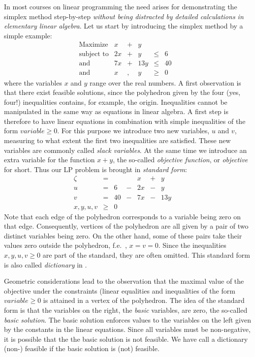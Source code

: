 \documentclass[ukenglish]{nik}
\begin{document}
In most courses on linear programming the need arises for demonstrating the simplex method step-by-step 
\emph{without being distracted by detailed calculations in elementary linear algebra}. Let us start by
introducing the simplex method by a simple example:
\[
    \begin{array}{llcrcrcrcrcrcr}
    \text{Maximize}  &    x &+&    y \\
    \text{subject to}&  2 x &+&    y &\leq&   6\\
    \text{and}&         7 x &+& 13 y &\leq&  40\\
    \text{and}       &    x &,&    y &\geq&0    &
    \end{array}
\]
where the variables $x$ and $y$ range over the real numbers.
A first observation is that there exist feasible solutions,
since the polyhedron given by the four (yes, four!) inequalities contains,
for example, the origin. Inequalities cannot be manipulated in the same
way as equations in linear algebra. A first step is therefore to
have linear equations in combination with simple inequalities of the form
$\mathit{variable}\geq 0$. For this purpose we introduce
two new variables, $u$ and $v$, measuring to what extent the first
two inequalities are satisfied. These new variables are commonly called
\emph{slack variables}. At the same time we introduce an extra variable
for the function $x+y$, the so-called \emph{objective function},
or \emph{objective} for short. Thus our LP problem is brought in
\emph{standard form}:
\[    
    \begin{array}{lcrcrcrcr}
      \zeta&=&   & &     x &+&     y & &  \\\hline
      u    &=& 6 &-&   2 x &-&     y & &  \\
      v    &=& 40&-&   7 x &-&  13 y & &  \\
      x,y,u,v  &\geq&0     & &  & &  & &    
    \end{array}
\]
Note that each edge of the polyhedron corresponds to a variable
being zero on that edge. Consequently,
vertices of the polyhedron are all given by a pair of
two distinct variables being zero. On the other hand, some of these
pairs take their values zero outside the polyhedron, f.e.\ , $x=v=0$.
Since the inequalities $x,y,u,v \geq 0$ are part of the standard, 
they are often omitted. This standard form is also called \emph{dictionary}
in \cite{Vanderbei}.

Geometric considerations lead to the observation that the
maximal value of the objective under the constraints (linear
equalities and inequalities of the form 
$\mathit{variable}\geq 0$ is attained in a vertex of the
polyhedron. The idea of the standard form is
that the variables on the right, the \emph{basic} variables, are zero,
the so-called \emph{basic solution}.
The basic solution enforces values to the variables on the left
given by the constants in the linear equations.
Since all variables must be non-negative, it is possible that
the the basic solution is not feasible. We have call a dictionary
(non-) feasible if the basic solution is (not) feasible.
\end{document}

